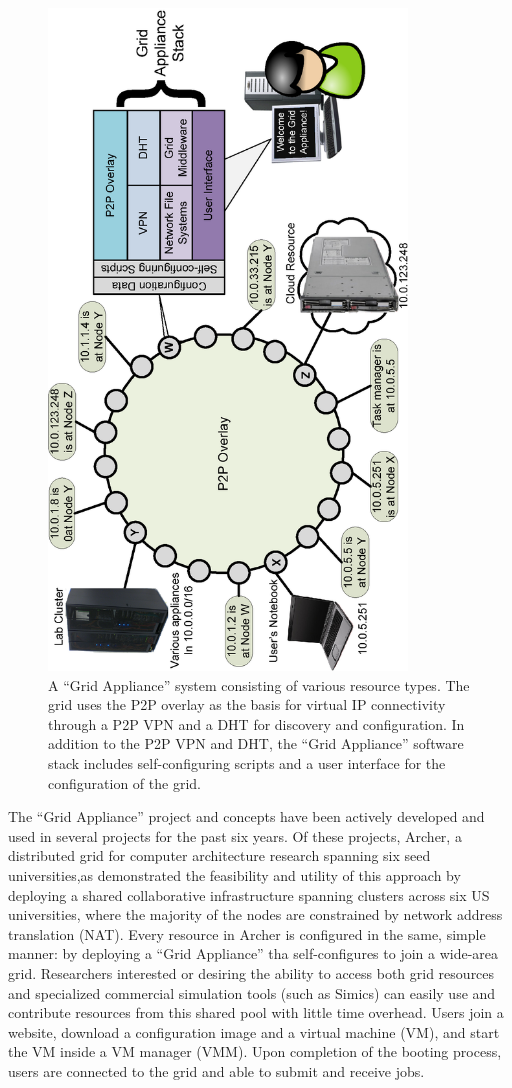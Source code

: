 \documentclass[conference]{IEEEtran}
\begin{document}
\begin{figure}[ht]
\centering
\includegraphics[width=3.75in,angle=-90]{figs/appliance_overlays.eps}
\caption{A ``Grid Appliance'' system consisting of various resource types.  The
grid uses the P2P overlay as the basis for virtual IP connectivity through a
P2P VPN and a DHT for discovery and configuration.  In addition to the P2P VPN
and DHT, the ``Grid Appliance'' software stack includes self-configuring
scripts and a user interface for the configuration of the grid.}
\label{fig:appliance}
\end{figure}

The ``Grid Appliance'' project and concepts have been actively developed and
used in several projects for the past six years.  Of these projects, Archer, a
distributed grid for computer architecture research spanning six seed
universities,as demonstrated the feasibility and utility of this approach by
deploying a shared collaborative infrastructure spanning clusters across six US
universities, where the majority of the nodes are constrained by network
address translation (NAT).  Every resource in Archer is configured in the same,
simple manner:  by deploying a ``Grid Appliance'' tha self-configures to join a
wide-area grid.  Researchers interested or desiring the ability to access both
grid resources and specialized commercial simulation tools (such as Simics) can
easily use and contribute resources from this shared pool with little time
overhead.  Users join a website, download a configuration image and a virtual
machine (VM), and start the VM inside a VM manager (VMM).  Upon completion of
the booting process, users are connected to the grid and able to submit and
receive jobs.
\end{document}
